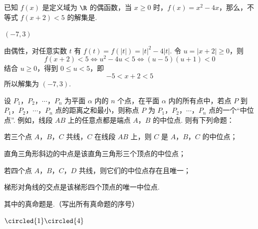 \begin{problem}
已知 \( f(x) \) 是定义域为 \( \R \) 的偶函数，当 \( x \geqslant 0 \) 时，\( f(x) = x^2 - 4x \)，那么，不等式 \( f(x + 2) < 5 \) 的解集是\fillinblank{}.
\end{problem}

\begin{answer}
\((-7,3)\)
\end{answer}

\begin{solution}
由偶性，对任意实数 \(t\) 有 \(f(t)=f(|t|)=|t|^2-4|t|\). 令 \(u=|x+2|\geqslant0\)，则
\[
f(x+2)<5\iff u^2-4u<5\iff (u-5)(u+1)<0
\]
结合 \(u\geqslant0\)，得到 \(0\leqslant u<5\)，即
\[
-5<x+2<5
\]
所以解集为 \((-7,3)\).
\end{solution}

\begin{problem}
设 \(P_1\)，\(P_2\)，\(\cdots\)，\(P_n\) 为平面 \(\alpha\) 内的 \(n\) 个点，在平面 \(\alpha\) 内的所有点中，若点 \(P\) 到 \(P_1\)，\(P_2\)，\(\cdots\)，\(P_n\) 点的距离之和最小，则称点 \(P\) 为 \(P_1\)，\(P_2\)，\(\cdots\)，\(P_n\) 点的一个“中位点”. 例如，线段 \(AB\) 上的任意点都是端点 \(A\)，\(B\) 的中位点. 则有下列命题：

\begin{circlelist}
\item 若三个点 \(A\)，\(B\)，\(C\) 共线，\(C\) 在线段 \(AB\) 上，则 \(C\) 是 \(A\)，\(B\)，\(C\) 的中位点；
\item 直角三角形斜边的中点是该直角三角形三个顶点的中位点；
\item 若四个点 \(A\)，\(B\)，\(C\)，\(D\) 共线，则它们的中位点存在且唯一；
\item 梯形对角线的交点是该梯形四个顶点的唯一中位点.
\end{circlelist}

其中的真命题是\fillinblank{}.（写出所有真命题的序号）
\end{problem}

\begin{answer}
\(\circled{1}\circled{4}\)
\end{answer}


